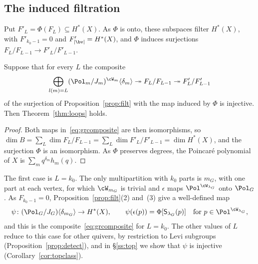 \documentclass[11pt]{amsart}
\begin{document}
\subsection{The induced filtration}\label{ss:induced}
Put $F'_L=\Phi(F_L)\subseteq H^*(X)$.  As $\Phi$ is onto, these subspaces
filter $H^*(X)$, with $F'_{k_0-1}=0$ and $F'_{|\bv|}=H^*(X)$, and $\Phi$
induces surjections $F_L/F_{L-1}\to F'_L/F'_{L-1}$.

\begin{lemma}\label{lem:reduction}
Suppose that for every $L$ the composite
\begin{equation}\label{eq:grcomposite}
 \bigoplus_{l(m)=L}(\Pol_m/J_m)^{\cW_m}\langle\delta_m\rangle
 \twoheadrightarrow F_L/F_{L-1}\twoheadrightarrow F'_L/F'_{L-1}
\end{equation}
of the surjection of Proposition~\ref{prop:filt} with the map induced by
$\Phi$ is injective.  Then Theorem~\ref{thm:loops} holds.
\end{lemma}

\begin{proof}
Both maps in~\eqref{eq:grcomposite} are then isomorphisms, so
$\dim B=\sum_L\dim F_L/F_{L-1}=\sum_L\dim F'_L/F'_{L-1}=\dim H^*(X)$, and the
surjection $\Phi$ is an isomorphism.  As $\Phi$ preserves degrees, the
Poincar\'e polynomial of $X$ is $\sum_mq^{\delta_m}h_m(q)$.
\end{proof}

The first case is $L=k_0$.  The only multipartition with $k_0$ parts is
$m_G$, with one part at each vertex, for which $\cW_{m_G}$ is trivial and
$\epsilon$ maps $\Pol^{\cW_{\lambda_G}}$ onto $\Pol_G$.  As $F_{k_0-1}=0$,
Proposition~\ref{prop:filt}(2) and~(3) give a well-defined map
\[
 \psi\colon(\Pol_G/J_G)\langle\delta_{m_G}\rangle\to H^*(X),\qquad
 \psi(\epsilon(p))=\Phi[\mathsf S_{\lambda_G}(p)]\quad\text{for }p\in\Pol^{\cW_{\lambda_G}},
\]
and this is the composite~\eqref{eq:grcomposite} for $L=k_0$.  The other
values of $L$ reduce to this case for other quivers, by restriction to Levi
subgroups (Proposition~\ref{prop:detect}), and in \S\ref{ss:top} we show that
$\psi$ is injective (Corollary~\ref{cor:topclass}).
\end{document}
